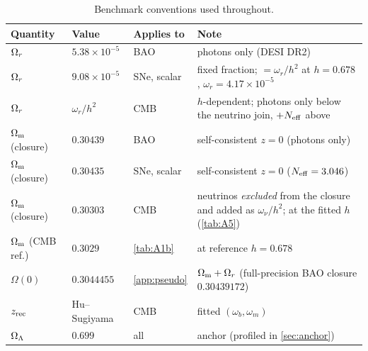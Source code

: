 \begin{table}[t]
\centering\small
\caption{Benchmark conventions used throughout.}\label{tab:conv}
\begin{tabularx}{\textwidth}{@{}l l l X@{}}
\toprule
Quantity & Value & Applies to & Note\\
\midrule
$\Omega_{r}$ & $5.38\times10^{-5}$ & BAO & photons only (DESI DR2)\\
$\Omega_{r}$ & $9.08\times10^{-5}$ & SNe, scalar & fixed fraction; $=\omega_r/h^2$ at $h=0.678$, $\omega_r=4.17\times10^{-5}$\\
$\Omega_{r}$ & $\omega_r/h^2$ & CMB & $h$-dependent; photons only below the neutrino join, $+N_{\rm eff}$ above\\
$\Omega_{\mathrm m}$ (closure) & $0.30439$ & BAO & self-consistent $z=0$ (photons only)\\
$\Omega_{\mathrm m}$ (closure) & $0.30435$ & SNe, scalar & self-consistent $z=0$ ($N_{\rm eff}=3.046$)\\
$\Omega_{\mathrm m}$ (closure) & $0.30303$ & CMB & neutrinos \emph{excluded} from the closure and added as $\omega_\nu/h^2$; at the fitted $h$ (\cref{tab:A5})\\
$\Omega_{\mathrm m}$ (CMB ref.) & $0.3029$ & \cref{tab:A1b} & at reference $h=0.678$\\
$\Omega(0)$ & $0.3044455$ & \cref{app:pseudo} & $\Omega_{\mathrm m}+\Omega_{r}$ (full-precision BAO closure $0.30439172$)\\
$z_{\rm rec}$ & Hu--Sugiyama & CMB & fitted $(\omega_b,\omega_m)$\\
$\Omega_{\Lambda}$ & $0.699$ & all & anchor (profiled in \cref{sec:anchor})\\
\bottomrule
\end{tabularx}
\end{table}
